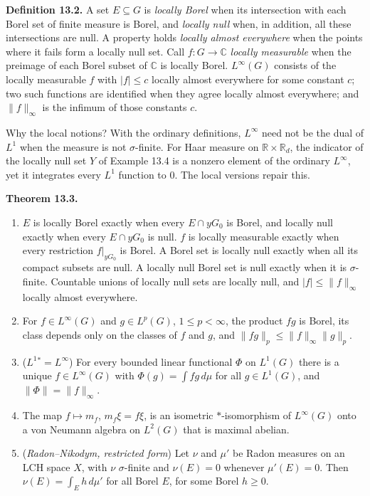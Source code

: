 \documentclass[
  english,
  11pt,
  a4paper,
]{article}
\providecommand{\tightlist}{%
  \setlength{\itemsep}{0pt}\setlength{\parskip}{0pt}}
\begin{document}
\textbf{Definition 13.2.} A set \(E\subseteq G\) is \emph{locally Borel}
when its intersection with each Borel set of finite measure is Borel,
and \emph{locally null} when, in addition, all these intersections are
null. A property holds \emph{locally almost everywhere} when the points
where it fails form a locally null set. Call \(f\colon G\to\mathbb C\)
\emph{locally measurable} when the preimage of each Borel subset of
\(\mathbb C\) is locally Borel. \(L^\infty(G)\) consists of the locally
measurable \(f\) with \(|f|\leq c\) locally almost everywhere for some
constant \(c\); two such functions are identified when they agree
locally almost everywhere; and \(\|f\|_\infty\) is the infimum of those
constants \(c\).

Why the local notions? With the ordinary definitions, \(L^\infty\) need
not be the dual of \(L^1\) when the measure is not \(\sigma\)-finite.
For Haar measure on \(\mathbb R\times\mathbb R_d\), the indicator of the
locally null set \(Y\) of Example 13.4 is a nonzero element of the
ordinary \(L^\infty\), yet it integrates every \(L^1\) function to
\(0\). The local versions repair this.

\textbf{Theorem 13.3.}

\begin{enumerate}
\tightlist
\item
  \(E\) is locally Borel exactly when every \(E\cap yG_0\) is Borel, and
  locally null exactly when every \(E\cap yG_0\) is null. \(f\) is
  locally measurable exactly when every restriction \(f|_{yG_0}\) is
  Borel. A Borel set is locally null exactly when all its compact
  subsets are null. A locally null Borel set is null exactly when it is
  \(\sigma\)-finite. Countable unions of locally null sets are locally
  null, and \(|f|\leq\|f\|_\infty\) locally almost everywhere.
\item
  For \(f\in L^\infty(G)\) and \(g\in L^p(G)\), \(1\leq p<\infty\), the
  product \(fg\) is Borel, its class depends only on the classes of
  \(f\) and \(g\), and \(\|fg\|_p\leq\|f\|_\infty\|g\|_p\).
\item
  (\emph{\(L^1{}^*=L^\infty\)}) For every bounded linear functional
  \(\Phi\) on \(L^1(G)\) there is a unique \(f\in L^\infty(G)\) with
  \(\Phi(g)=\int fg\,d\mu\) for all \(g\in L^1(G)\), and
  \(\|\Phi\|=\|f\|_\infty\).
\item
  The map \(f\mapsto m_f\), \(m_f\xi=f\xi\), is an isometric
  \(*\)-isomorphism of \(L^\infty(G)\) onto a von Neumann algebra on
  \(L^2(G)\) that is maximal abelian.
\item
  (\emph{Radon--Nikodym, restricted form}) Let \(\nu\) and \(\mu'\) be
  Radon measures on an LCH space \(X\), with \(\nu\) \(\sigma\)-finite
  and \(\nu(E)=0\) whenever \(\mu'(E)=0\). Then
  \(\nu(E)=\int_Eh\,d\mu'\) for all Borel \(E\), for some Borel
  \(h\geq0\).
\end{enumerate}
\end{document}
